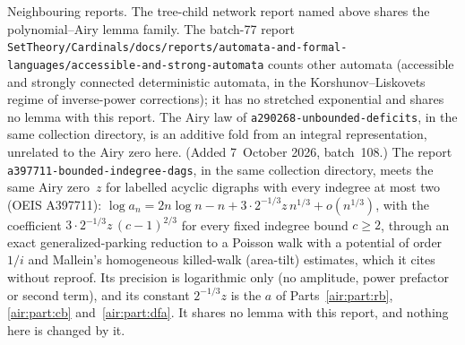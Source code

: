 \documentclass[11pt,letterpaper]{article}
\numberwithin{equation}{section}
\theoremstyle{remark}
\newcommand{\repopath}[1]{\nolinkurl{#1}}
\begin{document}
Neighbouring reports. The tree-child network report named above shares the polynomial--Airy lemma family. The batch-77 report \repopath{SetTheory/Cardinals/docs/reports/automata-and-formal-languages/accessible-and-strong-automata} counts other automata (accessible and strongly connected deterministic automata, in the Korshunov--Liskovets regime of inverse-power corrections); it has no stretched exponential and shares no lemma with this report. The Airy law of \repopath{a290268-unbounded-deficits}, in the same collection directory, is an additive fold from an integral representation, unrelated to the Airy zero here. (Added 7~October 2026, batch~108.) The report \repopath{a397711-bounded-indegree-dags}, in the same collection directory, meets the same Airy zero~$z$ for labelled acyclic digraphs with every indegree at most two (OEIS A397711): $\log a_n=2n\log n-n+3\cdot2^{-1/3}z\,n^{1/3}+o(n^{1/3})$, with the coefficient $3\cdot2^{-1/3}z\,(c-1)^{2/3}$ for every fixed indegree bound $c\ge2$, through an exact generalized-parking reduction to a Poisson walk with a potential of order $1/i$ and Mallein's homogeneous killed-walk (area-tilt) estimates, which it cites without reproof. Its precision is logarithmic only (no amplitude, power prefactor or second term), and its constant $2^{-1/3}z$ is the $a$ of Parts~\ref{air:part:rb}, \ref{air:part:cb} and~\ref{air:part:dfa}. It shares no lemma with this report, and nothing here is changed by it.
\end{document}
